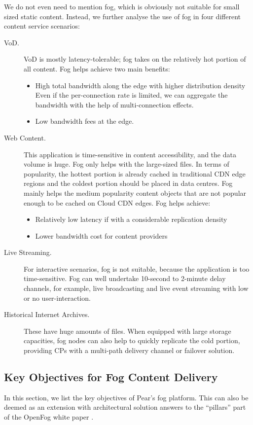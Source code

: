 We do not even need to mention fog, which is obviously not suitable for small sized static content. Instead, we further analyse the use of fog in four different content service scenarios:
\begin{description}
	\item[VoD.] VoD is mostly latency-tolerable; fog takes on the relatively hot portion of all content. Fog helps achieve two main benefits: 
	\begin{itemize}
		\item High total bandwidth along the edge with higher distribution density\\
		Even if the per-connection rate is limited, we can aggregate the bandwidth with the help of multi-connection effects. 
		\item Low bandwidth fees at the edge.\\
	\end{itemize}
	\item[Web Content.] This application is time-sensitive in content accessibility, and the data volume is huge. Fog only helps with the large-sized files. In terms of popularity, the hottest portion is already cached in traditional CDN edge regions and the coldest portion should be placed in data centres. Fog mainly helps the medium popularity content objects that are not popular enough to be cached on Cloud CDN edges. Fog helps achieve:
	\begin{itemize}
		\item Relatively low latency if with a considerable replication density
		\item Lower bandwidth cost for content providers
	\end{itemize}
	\item[Live Streaming.] For interactive scenarios, fog is not suitable, because the application is too time-sensitive. Fog can well undertake 10-second to 2-minute delay channels, for example, live broadcasting and live event streaming with low or no user-interaction. 
	\item[Historical Internet Archives.] These have huge amounts of files. When equipped with large storage capacities, fog nodes can also help to quickly replicate the cold portion, providing CPs with a multi-path delivery channel or failover solution. 
\end{description}

\subsection{Key Objectives for Fog Content Delivery}
In this section, we list the key objectives of Pear's fog platform. This can also be deemed as an extension with architectural solution answers to the ``pillars'' part of the OpenFog white paper \cite{openfog}. 
